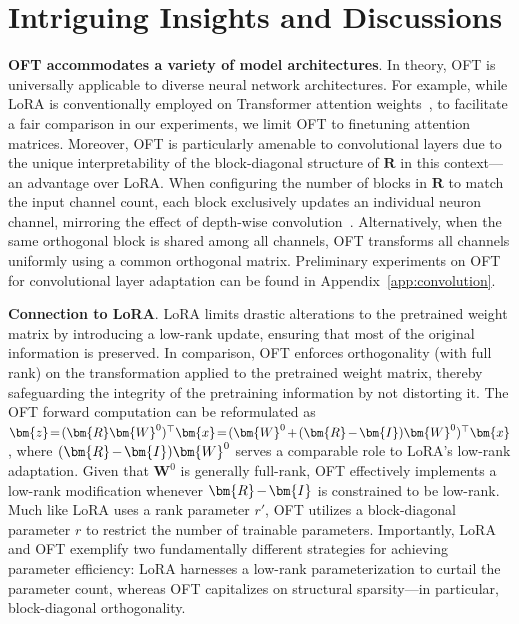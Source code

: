 \section{Intriguing Insights and Discussions}

\textbf{OFT accommodates a variety of model architectures}. In theory, OFT is universally applicable to diverse neural network architectures. For example, while LoRA is conventionally employed on Transformer attention weights~\cite{hulora2022}, to facilitate a fair comparison in our experiments, we limit OFT to finetuning attention matrices. Moreover, OFT is particularly amenable to convolutional layers due to the unique interpretability of the block-diagonal structure of $\bm{R}$ in this context—an advantage over LoRA. When configuring the number of blocks in $\bm{R}$ to match the input channel count, each block exclusively updates an individual neuron channel, mirroring the effect of depth-wise convolution~\cite{chollet2017xception}. Alternatively, when the same orthogonal block is shared among all channels, OFT transforms all channels uniformly using a common orthogonal matrix. Preliminary experiments on OFT for convolutional layer adaptation can be found in Appendix~\ref{app:convolution}.

\textbf{Connection to LoRA}. LoRA limits drastic alterations to the pretrained weight matrix by introducing a low-rank update, ensuring that most of the original information is preserved. In comparison, OFT enforces orthogonality (with full rank) on the transformation applied to the pretrained weight matrix, thereby safeguarding the integrity of the pretraining information by not distorting it. The OFT forward computation can be reformulated as $\thickmuskip=2mu \medmuskip=2mu \bm{z}=(\bm{R}\bm{W}^0)^\top\bm{x}=(\bm{W}^0+(\bm{R}-\bm{I})\bm{W}^0)^\top\bm{x}$, where $\thickmuskip=2mu \medmuskip=2mu (\bm{R}-\bm{I})\bm{W}^0$ serves a comparable role to LoRA's low-rank adaptation. Given that $\bm{W}^0$ is generally full-rank, OFT effectively implements a low-rank modification whenever $\thickmuskip=2mu \medmuskip=2mu \bm{R}-\bm{I}$ is constrained to be low-rank. Much like LoRA uses a rank parameter $r'$, OFT utilizes a block-diagonal parameter $r$ to restrict the number of trainable parameters. Importantly, LoRA and OFT exemplify two fundamentally different strategies for achieving parameter efficiency: LoRA harnesses a low-rank parameterization to curtail the parameter count, whereas OFT capitalizes on structural sparsity—in particular, block-diagonal orthogonality.

